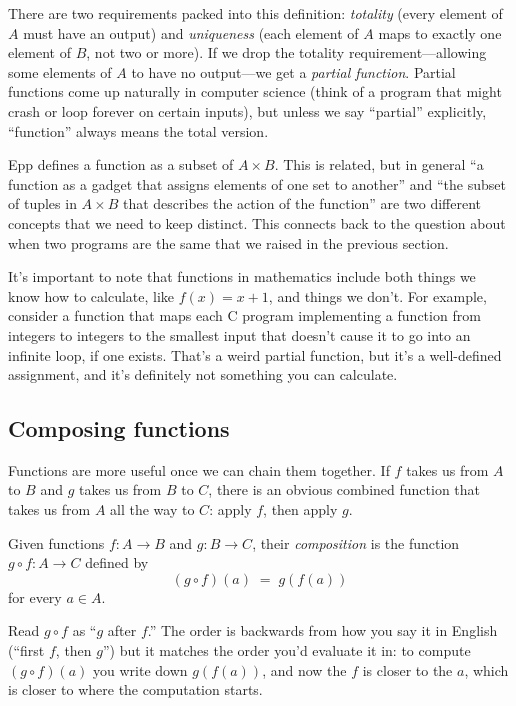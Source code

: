 \documentclass[11pt]{article}
\begin{document}
There are two requirements packed into this definition: \emph{totality} (every element of $A$ must have an output) and \emph{uniqueness} (each element of $A$ maps to exactly one element of $B$, not two or more). If we drop the totality requirement---allowing some elements of $A$ to have no output---we get a \emph{partial function}. Partial functions come up naturally in computer science (think of a program that might crash or loop forever on certain inputs), but unless we say ``partial'' explicitly, ``function'' always means the total version.

Epp defines a function as a subset of $A \times B$. This is related, but in general ``a function as a gadget that assigns elements of one set to another'' and ``the subset of tuples in $A \times B$ that describes the action of the function'' are two different concepts that we need to keep distinct. This connects back to the question about when two programs are the same that we raised in the previous section.

It's important to note that functions in mathematics include both things we know how to calculate, like $f(x) = x +1$, and things we don't. For example, consider a function that maps each C program implementing a function from integers to integers to the smallest input that doesn't cause it to go into an infinite loop, if one exists. That's a weird partial function, but it's a well-defined assignment, and it's definitely not something you can calculate.

\subsection*{Composing functions}

Functions are more useful once we can chain them together. If $f$ takes us from $A$ to $B$ and $g$ takes us from $B$ to $C$, there is an obvious combined function that takes us from $A$ all the way to $C$: apply $f$, then apply $g$.

\begin{definition}[Composition]
Given functions $f : A \to B$ and $g : B \to C$, their \emph{composition} is the function $g \circ f : A \to C$ defined by
\[
  (g \circ f)(a) \;=\; g(f(a))
\]
for every $a \in A$.
\end{definition}

Read $g \circ f$ as ``$g$ after $f$.'' The order is backwards from how you say it in English (``first $f$, then $g$'') but it matches the order you'd evaluate it in: to compute $(g \circ f)(a)$ you write down $g(f(a))$, and now the $f$ is closer to the $a$, which is closer to where the computation starts.
\end{document}
